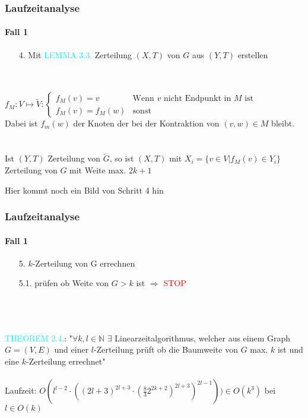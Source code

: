 \begin{frame}
\frametitle{Laufzeitanalyse}
\framesubtitle{Fall 1}

\begin{enumerate}
	\item[4.] Mit \textcolor{cyan}{LEMMA 3.3.} Zerteilung $(X,T)$ von $G$ aus $(Y,T)$ erstellen %
\end{enumerate}
\ \\
\ \\
$
f_M: V \mapsto \widetilde{V}:
\begin{cases} %
	f_M(v) = v &\text{Wenn } v \text{ nicht Endpunkt in } M \text{ ist} \\
	f_M(v) = f_M(w) &\text{sonst}
\end{cases}$\\
Dabei ist $f_m(w)$ der Knoten der bei der Kontraktion von $(v,w) \in M$ bleibt. \\
\ \\
\ \\
Ist $(Y,T)$ Zerteilung von $\widetilde{G}$, so ist $(X,T)$ mit $X_i = \{ v \in V | f_M(v) \in Y_i \}$ Zerteilung von $G$ mit Weite max. $2k+1$
\end{frame}

\begin{frame}
Hier kommt noch ein Bild von Schritt 4 hin
\end{frame}


\begin{frame}
\frametitle{Laufzeitanalyse}
\framesubtitle{Fall 1}

\begin{enumerate}
	\item[5.] $k$-Zerteilung von G errechnen
	\item[5.1.] prüfen ob Weite von $G > k$ ist $\Rightarrow$ \textcolor{red}{STOP}
\end{enumerate}
\ \\
\ \\
\ \\
\textcolor{cyan}{THEOREM 2.4.}: "$\forall k,l \in \mathbb{N}$ $\exists$ Linearzeitalgorithmus, welcher aus einem Graph $G=(V,E)$ und einer $l$-Zerteilung prüft ob die Baumweite von $G$ max. $k$ ist und eine $k$-Zerteilung errechnet" \\
\ \\
Laufzeit: $O(l^{l-2} \cdot ((2l+3)^{2l+3} \cdot (\frac{8}{3} 2^{2k+2})^{2l+3})^{2l-1})) \in O(k^3)$ bei $l \in O(k)$
\end{frame}